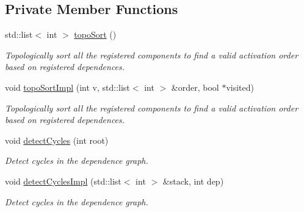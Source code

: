 \subsection*{Private Member Functions}
\begin{DoxyCompactItemize}
\item 
std\+::list$<$ int $>$ \hyperlink{structvt_1_1runtime_1_1component_1_1_component_pack_a5ca923fe22474d1c26a97d6d5dbfc0a3}{topo\+Sort} ()
\begin{DoxyCompactList}\small\item\em Topologically sort all the registered components to find a valid activation order based on registered dependences. \end{DoxyCompactList}\item 
void \hyperlink{structvt_1_1runtime_1_1component_1_1_component_pack_a7cb370457771ba9ebccd8892ffdafca9}{topo\+Sort\+Impl} (int v, std\+::list$<$ int $>$ \&order, bool $\ast$visited)
\begin{DoxyCompactList}\small\item\em Topologically sort all the registered components to find a valid activation order based on registered dependences. \end{DoxyCompactList}\item 
void \hyperlink{structvt_1_1runtime_1_1component_1_1_component_pack_a8e76881b315cccf8171f177a84d66f83}{detect\+Cycles} (int root)
\begin{DoxyCompactList}\small\item\em Detect cycles in the dependence graph. \end{DoxyCompactList}\item 
void \hyperlink{structvt_1_1runtime_1_1component_1_1_component_pack_acbe1421990318c9c43d5a83add91fa31}{detect\+Cycles\+Impl} (std\+::list$<$ int $>$ \&stack, int dep)
\begin{DoxyCompactList}\small\item\em Detect cycles in the dependence graph. \end{DoxyCompactList}\end{DoxyCompactItemize}

